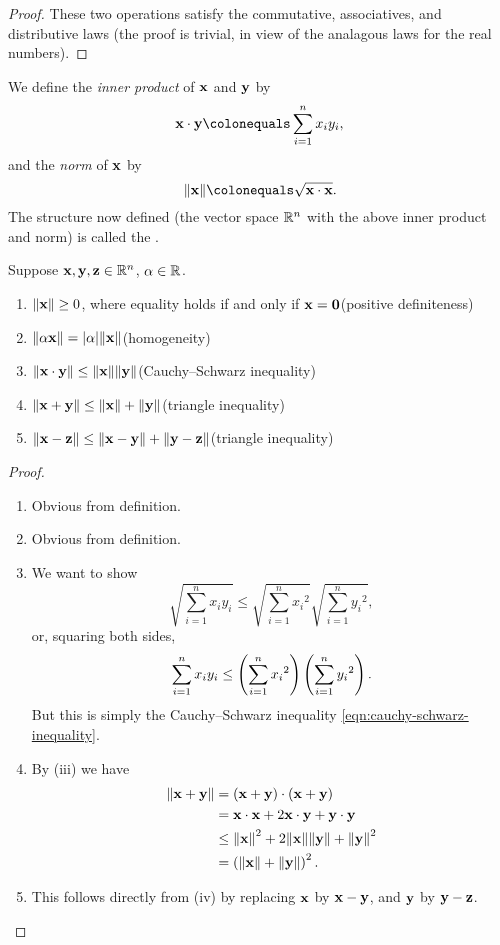 \begin{proof}
These two operations satisfy the commutative, associatives, and distributive laws (the proof is trivial, in view of the analagous laws for the real numbers).
\end{proof}

We define the \emph{inner product} of $\vb{x}$ and $\vb{y}$ by
\[\vb{x}\cdot\vb{y}\colonequals\sum_{i=1}^nx_iy_i,\]
and the \emph{norm} of $\vb{x}$ by
\[\norm{\vb{x}}\colonequals\sqrt{\vb{x}\cdot\vb{x}}.\]
The structure now defined (the vector space $\mathbb R^n$ with the above inner product and norm) is called the .

\begin{lemma}
Suppose $\vb{x},\vb{y},\vb{z}\in\mathbb R^n$, $\alpha\in\mathbb R$.
\begin{enumerate}[label=(\roman*)]
\item $\norm{\vb{x}}\ge0$, where equality holds if and only if $\vb{x}=\vb{0}$\hfill(positive definiteness)
\item $\norm{\alpha\vb{x}}=|\alpha|\norm{\vb{x}}$\hfill(homogeneity)
\item $\norm{\vb{x}\cdot\vb{y}}\le\norm{\vb{x}}\norm{\vb{y}}$\hfill(Cauchy--Schwarz inequality)
\item $\norm{\vb{x}+\vb{y}}\le\norm{\vb{x}}+\norm{\vb{y}}$\hfill(triangle inequality)
\item $\norm{\vb{x}-\vb{z}}\le\norm{\vb{x}-\vb{y}}+\norm{\vb{y}-\vb{z}}$\hfill(triangle inequality)
\end{enumerate}
\end{lemma}

\begin{proof} \
\begin{enumerate}[label=(\roman*)]
\item Obvious from definition.
\item Obvious from definition.
\item We want to show 
\[\sqrt{\sum_{i=1}^{n}x_iy_i}\le\sqrt{\sum_{i=1}^{n}{x_i}^2}\sqrt{\sum_{i=1}^{n}{y_i}^2},\]
or, squaring both sides,
\[\sum_{i=1}^{n}x_iy_i\le\left(\sum_{i=1}^{n}{x_i}^2\right)\left(\sum_{i=1}^{n}{y_i}^2\right).\]
But this is simply the Cauchy--Schwarz inequality \eqref{eqn:cauchy-schwarz-inequality}. 
\item By (iii) we have
\begin{align*}
\norm{\vb{x}+\vb{y}}&=(\vb{x}+\vb{y})\cdot(\vb{x}+\vb{y})\\
&=\vb{x}\cdot\vb{x}+2\vb{x}\cdot\vb{y}+\vb{y}\cdot\vb{y}\\
&\le\norm{\vb{x}}^2+2\norm{\vb{x}}\norm{\vb{y}}+\norm{\vb{y}}^2\\
&=\left(\norm{\vb{x}}+\norm{\vb{y}}\right)^2.
\end{align*}
\item This follows directly from (iv) by replacing $\vb{x}$ by $\vb{x}-\vb{y}$, and $\vb{y}$ by $\vb{y}-\vb{z}$.
\end{enumerate}
\end{proof}
\pagebreak

